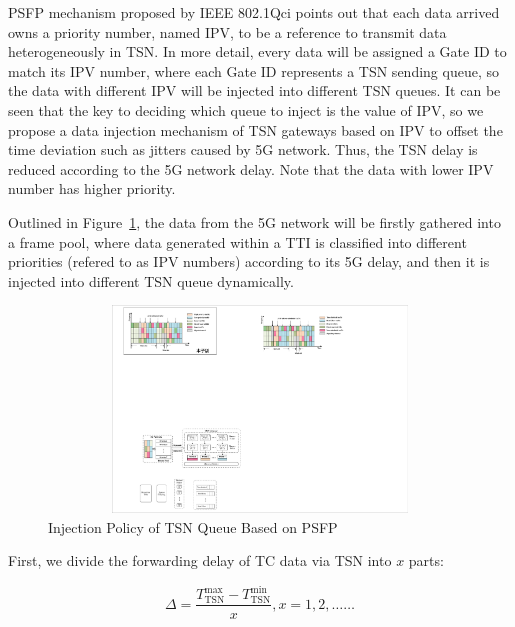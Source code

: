 \documentclass{SCIS2021}
\begin{document}
	\par PSFP mechanism proposed by IEEE 802.1Qci points out that each data arrived owns a priority number, named IPV, to be a reference to transmit data heterogeneously in TSN. In more detail, every data will be assigned a Gate ID to match its IPV number, where each Gate ID represents a TSN sending queue, so the data with different IPV will be injected into different TSN queues. It can be seen that the key to deciding which queue to inject is the value of IPV, so we propose a data injection mechanism of TSN gateways based on IPV to offset the time deviation such as jitters caused by 5G network. Thus, the TSN delay is reduced according to the 5G network delay. Note that the data with lower IPV number has higher priority.

	\par Outlined in Figure~\ref{fig:Injection Policy}, the data from the 5G network will be firstly gathered into a frame pool, where data generated within a TTI is classified into different priorities (refered to as IPV numbers) according to its 5G delay, and then it is injected into different TSN queue dynamically.

	\begin{figure}[t]
		\centering
		\includegraphics[height=5.5cm, width=14cm]{Injection}
		\caption{Injection Policy of TSN Queue Based on PSFP}
		\label{fig:Injection Policy}
	\end{figure}



	\par First, we divide the forwarding delay of TC data via TSN into $x$ parts:

	\setlength\abovedisplayskip{-16pt}
	\begin{center}
		\begin{equation}
			\Delta=\frac{T_{\text{TSN}}^{\text{max}}-T_{\text{TSN}}^{\text{min}}}{x}, x=1,2, \ldots \ldots
		\end{equation}
	\end{center}
	\setlength\belowdisplayskip{-8pt}
\end{document}
